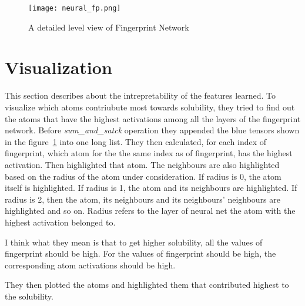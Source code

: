 \documentclass[11pt,a4paper]{report}
\begin{document}
\begin{figure}[]
	\centering
	\caption{A detailed level view of Fingerprint Network}
	\label{neural_fp}
	\texttt{[image: neural\_fp.png]}
\end{figure}

\section{Visualization	}
This section describes about the intrepretability of the features learned. To visualize which atoms contriubute most towards solubility, they tried to find out the atoms that have the highest activations among all the layers of the fingerprint network. Before \textit{sum\_and\_satck} operation they appended the blue tensors shown in the figure~\ref{neural_fp} into one long list. They then calculated, for each index of fingerprint, which atom for the the same index as of fingerprint, has the highest activation. Then highlighted that atom. The neighbours are also highlighted based on the radius of the atom under consideration. If radius is 0, the atom itself is highlighted. If radius is 1, the atom and its neighbours are highlighted. If radius is 2, then the atom, its neighbours and its neighbours' neighbours are highlighted and so on. Radius refers to the layer of neural net the atom with the highest activation belonged to.


I think what they mean is that to get higher solubility, all the values of fingerprint should be high. For the values of fingerprint should be high, the corresponding atom activations should be high.

They then plotted the atoms and highlighted them that contributed highest to the solubility.



\end{document}
